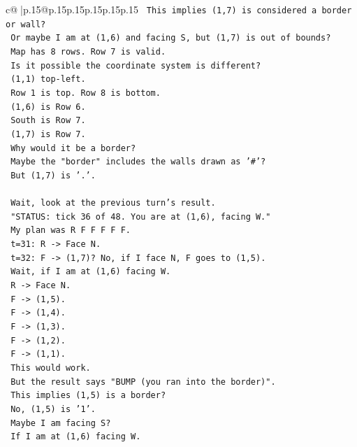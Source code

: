 \documentclass{article}
\begin{document}
{\begin{supertabular}{c@{$\;$}|p{.15\linewidth}@{}p{.15\linewidth}p{.15\linewidth}p{.15\linewidth}p{.15\linewidth}p{.15\linewidth}}
{{{\texttt{      This implies (1,7) is considered a border or wall?} \\
\texttt{      Or maybe I am at (1,6) and facing S, but (1,7) is out of bounds?} \\
\texttt{      Map has 8 rows. Row 7 is valid.} \\
\texttt{      Is it possible the coordinate system is different?} \\
\texttt{      (1,1) top{-}left.} \\
\texttt{      Row 1 is top. Row 8 is bottom.} \\
\texttt{      (1,6) is Row 6.} \\
\texttt{      South is Row 7.} \\
\texttt{      (1,7) is Row 7.} \\
\texttt{      Why would it be a border?} \\
\texttt{      Maybe the "border" includes the walls drawn as '\#'?} \\
\texttt{      But (1,7) is '.'.} \\
\\ 
\texttt{      Wait, look at the previous turn's result.} \\
\texttt{      "STATUS: tick 36 of 48. You are at (1,6), facing W."} \\
\texttt{      My plan was R F F F F F.} \\
\texttt{      t=31: R {-}> Face N.} \\
\texttt{      t=32: F {-}> (1,7)? No, if I face N, F goes to (1,5).} \\
\texttt{      Wait, if I am at (1,6) facing W.} \\
\texttt{      R {-}> Face N.} \\
\texttt{      F {-}> (1,5).} \\
\texttt{      F {-}> (1,4).} \\
\texttt{      F {-}> (1,3).} \\
\texttt{      F {-}> (1,2).} \\
\texttt{      F {-}> (1,1).} \\
\texttt{      This would work.} \\
\texttt{      But the result says "BUMP (you ran into the border)".} \\
\texttt{      This implies (1,5) is a border?} \\
\texttt{      No, (1,5) is '1'.} \\
\texttt{      Maybe I am facing S?} \\
\texttt{      If I am at (1,6) facing W.} \\
}}}
\end{supertabular}}
\end{document}
